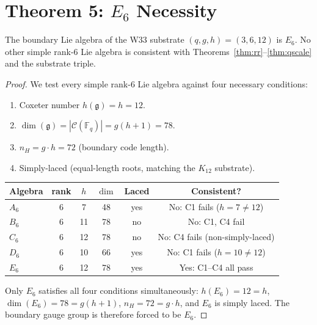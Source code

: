 \section{Theorem 5: $E_6$ Necessity}\label{sec:e6}

\begin{theorem}[$E_6$ Necessity]\label{thm:e6}
The boundary Lie algebra of the W33 substrate $(q,g,h)=(3,6,12)$ is $E_6$.
No other simple rank-$6$ Lie algebra is consistent with
Theorems~\ref{thm:rr}--\ref{thm:qscale} and the substrate triple.
\end{theorem}

\begin{proof}
We test every simple rank-$6$ Lie algebra against four necessary conditions:
\begin{enumerate}
\item[(C1)] Coxeter number $h(\mathfrak{g}) = h = 12$.
\item[(C2)] $\dim(\mathfrak{g}) = |\mathcal{C}(\mathbb{F}_q)| = g(h+1) = 78$.
\item[(C3)] $n_H = g\cdot h = 72$ (boundary code length).
\item[(C4)] Simply-laced (equal-length roots, matching the $K_{12}$ substrate).
\end{enumerate}

\begin{center}
\renewcommand{\arraystretch}{1.2}
\begin{tabular}{lccccc}
\hline
Algebra & rank & $h$ & $\dim$ & Laced & Consistent?\\
\hline
$A_6$ & 6 & 7 & 48 & yes & No: C1 fails ($h=7\neq 12$)\\
$B_6$ & 6 & 11 & 78 & no & No: C1, C4 fail\\
$C_6$ & 6 & 12 & 78 & no & No: C4 fails (non-simply-laced)\\
$D_6$ & 6 & 10 & 66 & yes & No: C1 fails ($h=10\neq 12$)\\
$E_6$ & 6 & 12 & 78 & yes & Yes: C1--C4 all pass\\
\hline
\end{tabular}
\end{center}

Only $E_6$ satisfies all four conditions simultaneously:
$h(E_6)=12=h$, $\dim(E_6)=78=g(h+1)$, $n_H=72=g\cdot h$,
and $E_6$ is simply laced.
The boundary gauge group is therefore forced to be $E_6$.\end{proof}

